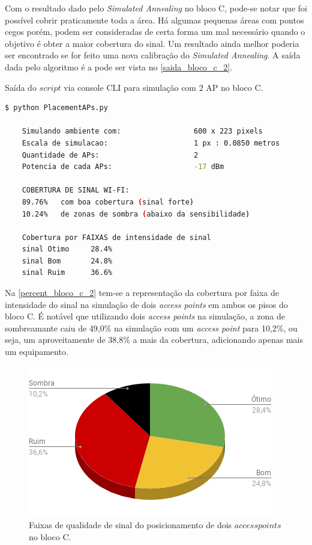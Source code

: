 \documentclass[
	12pt,				%
	twoside,			%
	a4paper,			%
	english,			%
	french,				%
	spanish,			%
	brazil				%
	]{abntex2}
\begin{document}
Com o resultado dado pelo \emph{Simulated Annealing} no bloco C, pode-se
notar que foi possível cobrir praticamente toda a área. Há algumas
pequenas áreas com pontos cegos porém, podem ser consideradas de certa
forma um mal necessário quando o objetivo é obter a maior cobertura do
sinal. Um resultado ainda melhor poderia ser encontrado se for feito uma
nova calibração do \emph{Simulated Annealing}. A saída dada pelo
algoritmo é a pode ser vista no \autoref{saida_bloco_c_2}.

\begin{quadro}[!htb]
    \caption{\label{saida_bloco_c_2} Saída do $script$ via console CLI para simulação com 2 AP no bloco C. }

    \begin{lstlisting}[language=bash]
    $ python PlacementAPs.py 

    Simulando ambiente com:                 600 x 223 pixels
    Escala de simulacao:                    1 px : 0.0850 metros
    Quantidade de APs:                      2
    Potencia de cada APs:                   -17 dBm

    COBERTURA DE SINAL WI-FI:
    89.76%   com boa cobertura (sinal forte)
    10.24%   de zonas de sombra (abaixo da sensibilidade)

    Cobertura por FAIXAS de intensidade de sinal
    sinal Otimo     28.4%
    sinal Bom       24.8%
    sinal Ruim      36.6%
    \end{lstlisting}

\end{quadro}

Na \autoref{percent_bloco_c_2} tem-se a representação da cobertura por
faixa de intensidade do sinal na simulação de dois \emph{access points}
em ambos os pisos do bloco C. É notável que utilizando dois \emph{access
points} na simulação, a zona de sombreamante caiu de 49,0\% na simulação
com um \emph{access point} para 10,2\%, ou seja, um aproveitamente de
38,8\% a mais da cobertura, adicionando apenas mais um equipamento.

\begin{figure}[ht]
    \caption{\label{percent_bloco_c_2} Faixas de qualidade de sinal do posicionamento de dois $access points$ no bloco C.}
    \begin{center}
        \includegraphics[scale=0.7]{imagens/percent-bloco-c-2.png}
    \end{center}
\end{figure}
\end{document}
